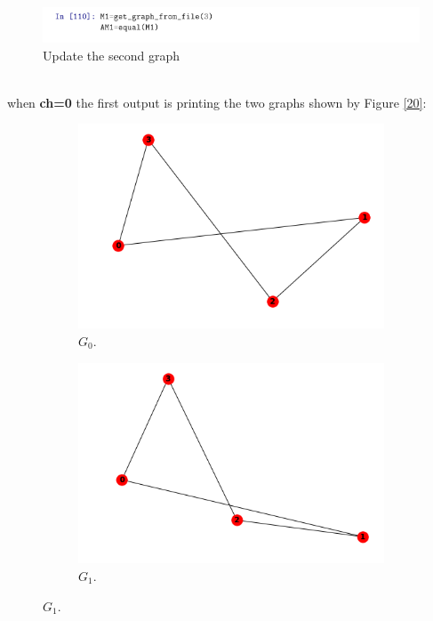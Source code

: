 \documentclass[12pt,a4paper]{article}
\begin{document}
\begin{itemize}
\begin{figure}[h]
	\centering
	\includegraphics[width=1.25\linewidth]{3-9}
	\caption{Update the second graph}
	\label{fig:3-9}
\end{figure}\\
when \textbf{ch=0} the first output is printing the two graphs shown by Figure \ref{20}:\\
\begin{figure}[h!]
	\centering\begin{subfigure}[b]{.35\linewidth}
		\includegraphics[width=\linewidth]{3-10.png}
		\caption{$G_0$.}
	\end{subfigure}
	\begin{subfigure}[b]{.35\linewidth}
		\includegraphics[width=\linewidth]{3-13.png}
		\caption{$G_1$.}
	\end{subfigure}

\end{figure}
\end{itemize}
\end{document}
